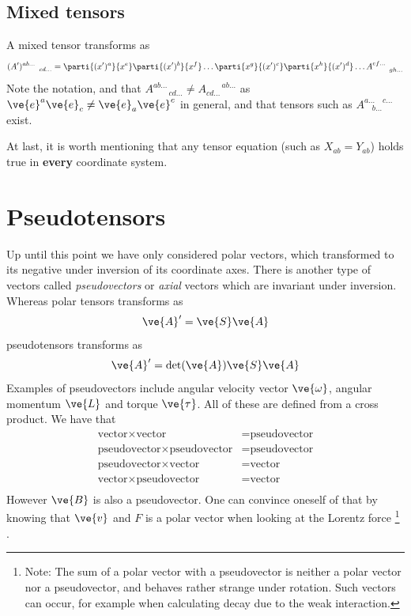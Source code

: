 \documentclass[a4paper, 12pt]{article}
\begin{document}
\subsection{Mixed tensors}
A mixed tensor transforms as
%
\begin{align*}
 (A')^{ab\ldots}_{\qquad cd\ldots} = 
 \parti{(x')^{a}}{x^{e}}\parti{(x')^{b}}{x^{f}}\ldots 
 \parti{x^{g}}{(x')^{c}}\parti{x^{h}}{(x')^{d}}\ldots 
  A^{ef\ldots}_{\qquad gh\ldots}
\end{align*}
%
Note the notation, and that $A^{ab\ldots}_{\qquad cd\ldots} \neq 
A^{\qquad ab\ldots}_{cd\ldots}$ as $\ve{e}^a\ve{e}_c \neq \ve{e}_a\ve{e}^c$ in 
general, and that tensors such as $A^{a\ldots \quad c\ldots}_{\quad b\ldots}$ 
exist.

At last, it is worth mentioning that any tensor equation (such as 
$X_{ab}=Y_{ab}$) holds true in \textbf{every} coordinate system.




\section{Pseudotensors}
Up until this point we have only considered polar vectors, which transformed to 
its negative under inversion of its coordinate axes. There is another type of 
vectors called \emph{pseudovectors} or \emph{axial} vectors which are invariant 
under inversion. Whereas polar tensors transforms as
%
\begin{align*}
 \ve{A}' = \ve{S}\ve{A}
\end{align*}
%
pseudotensors transforms as
%
\begin{align*}
 \ve{A}' = \det(\ve{A})\ve{S}\ve{A}
\end{align*}
%
Examples of pseudovectors include angular velocity vector $\ve{\omega}$, 
angular momentum $\ve{L}$ and torque $\ve{\tau}$. All of these are defined 
from a cross product. We have that
%
\begin{align*}
 \text{vector} \times \text{vector} &= \text{pseudovector}\\
 \text{pseudovector} \times \text{pseudovector} &= \text{pseudovector}\\
 \text{pseudovector} \times \text{vector} &= \text{vector}\\
 \text{vector} \times \text{pseudovector} &= \text{vector}\\
\end{align*}
%
However $\ve{B}$ is also a pseudovector. One can convince oneself of that by 
knowing that $\ve{v}$ and $F$ is a polar vector when looking at the Lorentz 
force%
\footnote{Note: The sum of a polar vector with a pseudovector is neither a 
polar vector nor a pseudovector, and behaves rather strange under rotation. 
Such vectors can occur, for example when calculating decay due to the weak 
interaction.}%
.
\end{document}

